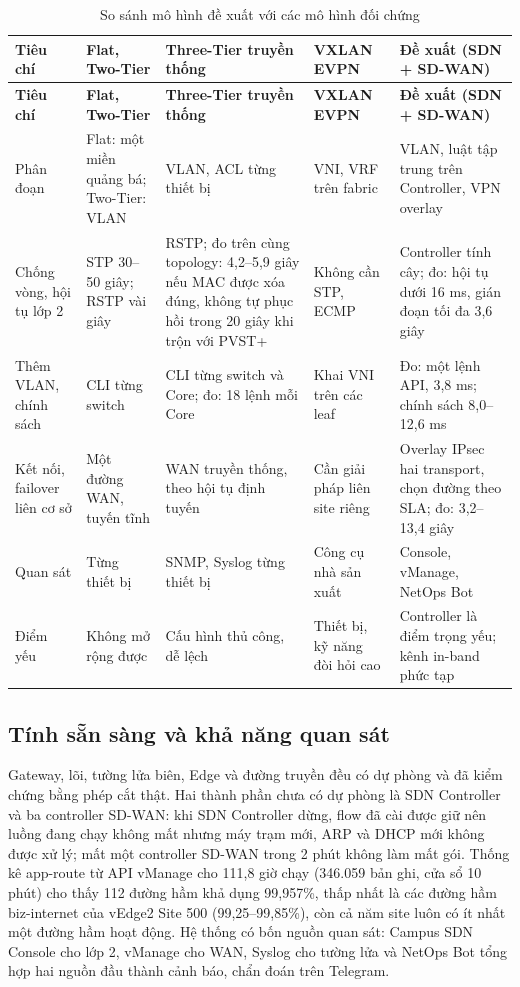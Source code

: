 \begingroup
\small
\setlength{\tabcolsep}{3pt}
\begin{longtable}{|L{2.2cm}|L{2.9cm}|L{3.0cm}|L{2.9cm}|L{3.35cm}|}
    \caption{So sánh mô hình đề xuất với các mô hình đối chứng}\label{tab:so_sanh_mo_hinh} \\
    \hline
    \textbf{Tiêu chí} & \textbf{Flat, Two-Tier} & \textbf{Three-Tier truyền thống} & \textbf{VXLAN EVPN} & \textbf{Đề xuất (SDN + SD-WAN)} \\
    \hline
    \endfirsthead
    \hline
    \textbf{Tiêu chí} & \textbf{Flat, Two-Tier} & \textbf{Three-Tier truyền thống} & \textbf{VXLAN EVPN} & \textbf{Đề xuất (SDN + SD-WAN)} \\
    \hline
    \endhead
    \hline
    \endfoot
    Phân đoạn & Flat: một miền quảng bá; Two-Tier: VLAN & VLAN, ACL từng thiết bị & VNI, VRF trên fabric & VLAN, luật tập trung trên Controller, VPN overlay \\
    \hline
    Chống vòng, hội tụ lớp 2 & STP 30--50 giây; RSTP vài giây & RSTP; đo trên cùng topology: 4,2--5,9 giây nếu MAC được xóa đúng, không tự phục hồi trong 20 giây khi trộn với PVST+ & Không cần STP, ECMP & Controller tính cây; đo: hội tụ dưới 16 ms, gián đoạn tối đa 3,6 giây \\
    \hline
    Thêm VLAN, chính sách & CLI từng switch & CLI từng switch và Core; đo: 18 lệnh mỗi Core & Khai VNI trên các leaf & Đo: một lệnh API, 3,8 ms; chính sách 8,0--12,6 ms \\
    \hline
    Kết nối, failover liên cơ sở & Một đường WAN, tuyến tĩnh & WAN truyền thống, theo hội tụ định tuyến & Cần giải pháp liên site riêng & Overlay IPsec hai transport, chọn đường theo SLA; đo: 3,2--13,4 giây \\
    \hline
    Quan sát & Từng thiết bị & SNMP, Syslog từng thiết bị & Công cụ nhà sản xuất & Console, vManage, NetOps Bot \\
    \hline
    Điểm yếu & Không mở rộng được & Cấu hình thủ công, dễ lệch & Thiết bị, kỹ năng đòi hỏi cao & Controller là điểm trọng yếu; kênh in-band phức tạp \\
\end{longtable}
\endgroup

\subsection{Tính sẵn sàng và khả năng quan sát}\label{sec:san_sang}

Gateway, lõi, tường lửa biên, Edge và đường truyền đều có dự phòng và đã kiểm chứng bằng phép cắt thật. Hai thành phần chưa có dự phòng là SDN Controller và ba controller SD-WAN: khi SDN Controller dừng, flow đã cài được giữ nên luồng đang chạy không mất nhưng máy trạm mới, ARP và DHCP mới không được xử lý; mất một controller SD-WAN trong 2 phút không làm mất gói. Thống kê app-route từ API vManage cho 111,8 giờ chạy (346.059 bản ghi, cửa sổ 10 phút) cho thấy 112 đường hầm khả dụng 99,957\%, thấp nhất là các đường hầm biz-internet của vEdge2 Site 500 (99,25--99,85\%), còn cả năm site luôn có ít nhất một đường hầm hoạt động. Hệ thống có bốn nguồn quan sát: Campus SDN Console cho lớp 2, vManage cho WAN, Syslog cho tường lửa và NetOps Bot tổng hợp hai nguồn đầu thành cảnh báo, chẩn đoán trên Telegram.


